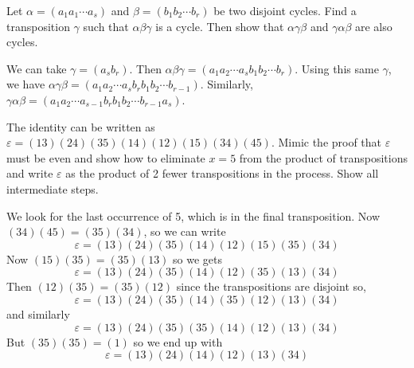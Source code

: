 \documentclass[11pt]{exam}
\begin{document}
\begin{questions}


\question[4] Let $\alpha = (a_1a_1\cdots a_s)$ and $\beta = (b_1b_2\cdots b_r)$ be two disjoint cycles.  Find a transposition $\gamma$ such that $\alpha\beta\gamma$ is a cycle.  Then show that $\alpha\gamma\beta$ and $\gamma\alpha\beta$ are also cycles.

\begin{solution}
We can take $\gamma = (a_sb_r)$.  Then $\alpha\beta\gamma = (a_1a_2\cdots a_sb_1b_2\cdots b_r)$.  Using this same $\gamma$, we have $\alpha\gamma\beta = (a_1a_2\cdots a_sb_rb_1b_2\cdots b_{r-1})$.  Similarly, $\gamma\alpha\beta = (a_1a_2\cdots a_{s-1}b_rb_1b_2\cdots b_{r-1}a_s)$.
\end{solution}


\question[5] The identity can be written as $\varepsilon = (13)(24)(35)(14)(12)(15)(34)(45)$.
Mimic the proof that $\varepsilon$ must be even and show how to eliminate $x = 5$ from the product of transpositions and write $\varepsilon$ as the product of 2 fewer transpositions in the process.  Show all intermediate steps.

\begin{solution}
  We look for the last occurrence of 5, which is in the final transposition.  Now $(34)(45) = (35)(34)$, so we can write
  \[\varepsilon = (13)(24)(35)(14)(12)(15)(35)(34)\]
  Now $(15)(35) = (35)(13)$ so we gets
   \[\varepsilon = (13)(24)(35)(14)(12)(35)(13)(34)\]
   Then $(12)(35) = (35)(12)$ since the transpositions are disjoint so,
   \[\varepsilon = (13)(24)(35)(14)(35)(12)(13)(34)\]
   and similarly
   \[\varepsilon = (13)(24)(35)(35)(14)(12)(13)(34)\]
   But $(35)(35) = (1)$ so we end up with
   \[\varepsilon = (13)(24)(14)(12)(13)(34)\]
\end{solution}





\end{questions}
\end{document}
